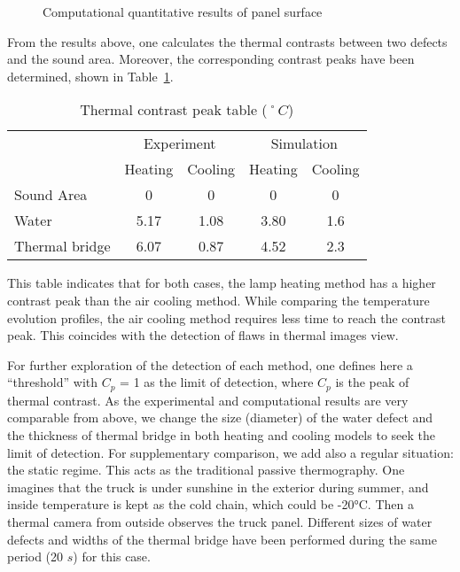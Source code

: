 \begin{figure}
    \hspace{-18pt}
    \hspace{6pt}
    \caption{Computational quantitative results of panel surface}
    \label{sim_fig}
\end{figure}
From the results above, one calculates the thermal contrasts between two defects and the sound area. Moreover, the corresponding contrast peaks have been determined, shown in Table~\ref{tab_TCP}.
\begin{table}[ht]
    \centering
    \small
    \caption{Thermal contrast peak table ($˚C$)}
    \begin{tabular}{l|cc|cc}
        \toprule
        & \multicolumn{2}{c|}{Experiment} & \multicolumn{2}{c}{Simulation} \\
         & Heating & Cooling & Heating & Cooling \\
        \midrule
        Sound Area & 0 & 0 & 0 & 0 \\
        Water & 5.17 & 1.08 & 3.80 & 1.6 \\
        Thermal bridge & 6.07 & 0.87 & 4.52 & 2.3 \\  
        \bottomrule
    \end{tabular}
    \label{tab_TCP}
\end{table}
This table indicates that for both cases, the lamp heating method has a higher contrast peak than the air cooling method. While comparing the temperature evolution profiles, the air cooling method requires less time to reach the contrast peak. This coincides with the detection of flaws in thermal images view.

For further exploration of the detection of each method, one defines here a “threshold” with $C_p$ = 1 as the limit of detection, where $C_p$ is the peak of thermal contrast. As the experimental and computational results are very comparable from above, we change the size (diameter) of the water defect and the thickness of thermal bridge in both heating and cooling models to seek the limit of detection. For supplementary comparison, we add also a regular situation: the static regime. This acts as the traditional passive thermography. One imagines that the truck is under sunshine in the exterior during summer, and inside temperature is kept as the cold chain, which could be -20°C. Then a thermal camera from outside observes the truck panel. Different sizes of water defects and widths of the thermal bridge have been performed during the same period (20 $s$) for this case.

